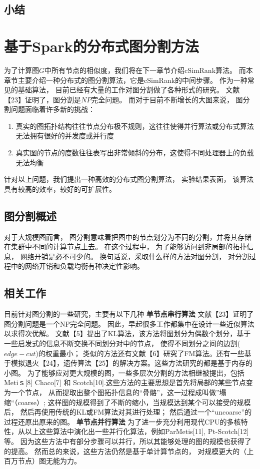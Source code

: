 \documentclass[master]{njuthesis}
\begin{document}
\section{小结}
\chapter{基于Spark的分布式图分割方法}\label{chapter_graphpartition}
为了计算图$G$中所有节点的相似度，我们将在下一章节介绍cSimRank算法。 而本章节主要介绍一种分布式的图分割算法，它是cSimRank的中间步骤。
作为一种常见的基础算法， 目前已经有大量的工作对图分割做了各种形式的研究。 文献【23】证明了，图分割是$NP$完全问题。
而对于目前不断增长的大图来说， 图分割问题面临着许多新的挑战：
\begin{enumerate}
 \item 真实的图拓扑结构往往节点分布极不规则，这往往使得并行算法或分布式算法无法拥有很好的并发度或并行度
 \item 真实图的节点的度数往往表写出非常倾斜的分布，这使得不同处理器上的负载无法均衡
\end{enumerate}
针对以上问题，我们提出一种高效的分布式图分割算法， 实验结果表面， 该算法具有较高的效率，较好的可扩展性。

\section{图分割概述}
对于大规模图而言， 图分割意味着把图中的节点划分为不同的分割，并将其存储在集群中不同的计算节点上去。
在这个过程中， 为了能够访问到非局部的拓扑信息， 网络开销是必不可少的。 换句话说，采取什么样的方法对图分割，
对分割过程中的网络开销和负载均衡有种决定性影响。
\section{相关工作}
目前针对图分割的一些研究，主要有以下几种
\textbf{单节点串行算法} 文献【23】证明了图分割问题是一个NP完全问题。 因此，早起很多工作都集中在设计一些近似算法以求得次优解。
文献【5】提出了KL算法，该方法将图划分为偶数个划分，基于一些启发式的信息不断交换不同划分对中的节点， 使得不同划分之间的边割($edge-cut$)的权重最小；
类似的方法还有文献【6】研究了FM算法。还有一些基于模拟退火【24】，遗传算法【25】的解决方案。这些方法研究的都是基于内存的小图。
为了能够应对更大规模的图，一些多层次分割的方法相继被提出，包括 Metiｓ[8] Chaco[7]  和 Scotch[10].这些方法的主要思想是首先将局部的某些节点变为一个节点，
从而提取出整个图拓扑信息的“骨骼”，这一过程成叫做”塌缩“（coarse）; 这样图的规模得到了不断的缩小，当规模达到某个可以接受的规模后， 然后再使用传统的KL或FM算法对其进行处理；
然后通过一个“uncoarse”的过程还原出原来的图。
\textbf{单节点并行算法} 为了进一步充分利用现代CPU的多核特性，从以上这些算法中演化出一些并行化算法，例如ParMetis[11], Pt-Scotch[12]等。 
因为这些方法中有部分步骤可以并行，所以其能够处理的图的规模也获得了的提高。 然而总的来说，这些方法仍然是基于单计算节点的， 对规模更大的（上百万节点）图无能为力。
\end{document}
